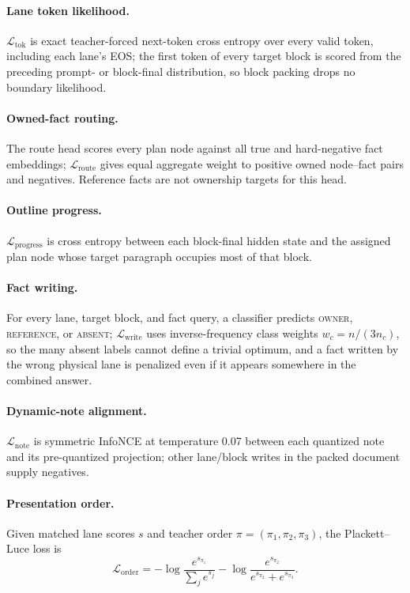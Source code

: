 \documentclass[10pt]{article}
\begin{document}
\paragraph{Lane token likelihood.}
\(\mathcal L_{\mathrm{tok}}\) is exact teacher-forced next-token cross
entropy over every valid token, including each lane's EOS; the first token of
every target block is scored from the preceding prompt- or block-final
distribution, so block packing drops no boundary likelihood.

\paragraph{Owned-fact routing.}
The route head scores every plan node against all true and hard-negative
fact embeddings; \(\mathcal L_{\mathrm{route}}\) gives equal aggregate weight
to positive owned node--fact pairs and negatives. Reference facts are not
ownership targets for this head.

\paragraph{Outline progress.}
\(\mathcal L_{\mathrm{progress}}\) is cross entropy between each block-final
hidden state and the assigned plan node whose target paragraph occupies most
of that block.

\paragraph{Fact writing.}
For every lane, target block, and fact query, a classifier predicts
\textsc{owner}, \textsc{reference}, or \textsc{absent};
\(\mathcal L_{\mathrm{write}}\) uses inverse-frequency class weights
\(
w_c=n/(3n_c)
\),
so the many absent labels cannot define a trivial optimum, and a fact written
by the wrong physical lane is penalized even if it appears somewhere in the
combined answer.

\paragraph{Dynamic-note alignment.}
\(\mathcal L_{\mathrm{note}}\) is symmetric InfoNCE at temperature 0.07
between each quantized note and its pre-quantized projection; other
lane/block writes in the packed document supply negatives.

\paragraph{Presentation order.}
Given matched lane scores \(s\) and teacher order
\(\pi=(\pi_1,\pi_2,\pi_3)\), the Plackett--Luce loss is
\begin{equation}
\mathcal L_{\mathrm{order}}
=-\log\frac{e^{s_{\pi_1}}}{\sum_j e^{s_j}}
-\log\frac{e^{s_{\pi_2}}}{e^{s_{\pi_2}}+e^{s_{\pi_3}}}.
\end{equation}
\end{document}
